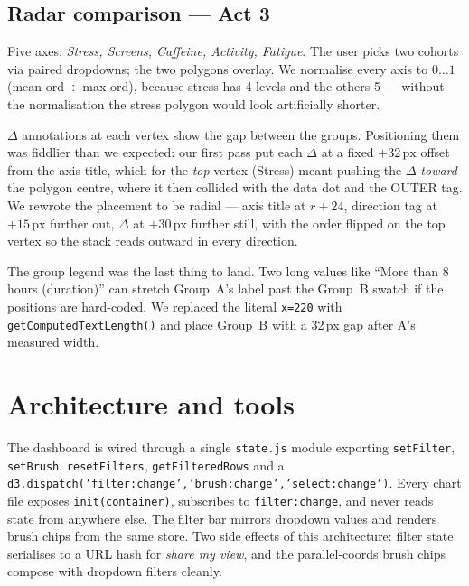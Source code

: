 \documentclass[11pt,a4paper]{article}
\newcommand{\code}[1]{\texttt{\small #1}}
\begin{document}
\subsection{Radar comparison — Act 3}

Five axes: \emph{Stress, Screens, Caffeine, Activity, Fatigue}. The user picks two cohorts via paired dropdowns; the two polygons overlay. We normalise every axis to $0\ldots1$ (mean ord $\div$ max ord), because stress has 4 levels and the others 5 — without the normalisation the stress polygon would look artificially shorter.

$\Delta$ annotations at each vertex show the gap between the groups. Positioning them was fiddlier than we expected: our first pass put each $\Delta$ at a fixed $+32\,\text{px}$ offset from the axis title, which for the \emph{top} vertex (Stress) meant pushing the $\Delta$ \emph{toward} the polygon centre, where it then collided with the data dot and the OUTER tag. We rewrote the placement to be radial — axis title at $r+24$, direction tag at $+15\,\text{px}$ further out, $\Delta$ at $+30\,\text{px}$ further still, with the order flipped on the top vertex so the stack reads outward in every direction.

The group legend was the last thing to land. Two long values like ``More than 8\,hours (duration)'' can stretch Group~A's label past the Group~B swatch if the positions are hard-coded. We replaced the literal \code{x=220} with \code{getComputedTextLength()} and place Group~B with a 32\,px gap after A's measured width.


\section{Architecture and tools}
\label{sec:arch}

The dashboard is wired through a single \code{state.js} module exporting \code{setFilter}, \code{setBrush}, \code{resetFilters}, \code{getFilteredRows} and a \code{d3.dispatch('\!filter:change','\!brush:change','\!select:change')}. Every chart file exposes \code{init(container)}, subscribes to \code{filter:change}, and never reads state from anywhere else. The filter bar mirrors dropdown values and renders brush chips from the same store. Two side effects of this architecture: filter state serialises to a URL hash for \emph{share my view}, and the parallel-coords brush chips compose with dropdown filters cleanly.
\end{document}
